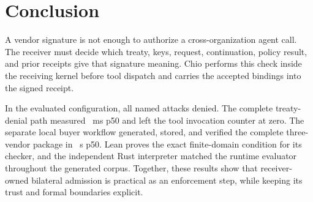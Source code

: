 \section{Conclusion}

A vendor signature is not enough to authorize a cross-organization agent call.
The receiver must decide which treaty, keys, request, continuation, policy
result, and prior receipts give that signature meaning. Chio performs this
check inside the receiving kernel before tool dispatch and carries the accepted
bindings into the signed receipt.

In the evaluated configuration, all \PSThreatCaseCount{} named attacks denied.
The complete treaty-denial path measured
\PSPredispatchDenyPFiftyMs~ms p50 and left the tool invocation counter at zero.
The separate local buyer workflow generated, stored, and verified the complete
three-vendor package in \PSBuyerWorkflowPFiftySec~s p50. Lean proves the exact
finite-domain condition for its checker, and the independent Rust interpreter
matched the runtime evaluator throughout the
generated corpus. Together, these results show that receiver-owned bilateral
admission is practical as an enforcement step, while keeping its trust and
formal boundaries explicit.
